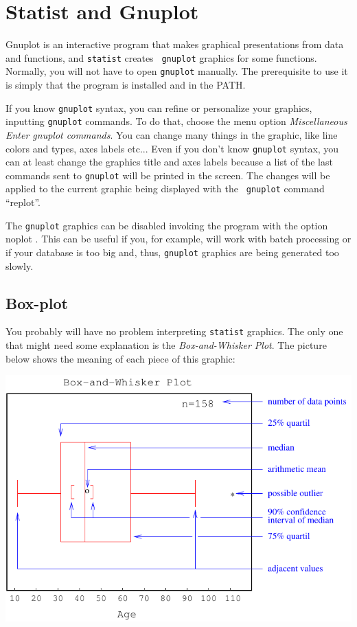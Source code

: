\documentclass[12pt,english]{article}
\newcommand{\st}{{\tt sta\-tist} }
\begin{document}
 
\section{Statist and Gnuplot}

Gnuplot is an interactive program that makes graphical
presentations from data and functions, and \st creates {\tt
gnuplot} graphics for some functions. Normally, you will not
have to open {\tt gnuplot} manually. The prerequisite to use
it is simply that the program is installed and in the PATH.

If you know {\tt gnuplot} syntax, you can refine or
personalize your graphics, inputting {\tt gnu\-plot}
commands. To do that, choose the menu option {\em
Miscellaneous} {\textbar} {\em Enter gnuplot commands}. You can change many
things in the graphic, like line colors and types, axes
labels etc... Even if you don't know {\tt gnuplot} syntax,
you can at least change the graphics title and axes labels
because a list of the last commands sent to {\tt gnuplot}
will be printed in the screen.  The changes will be applied
to the current graphic being displayed with the {\tt
gnuplot} command ``replot''. 

The {\tt gnuplot} graphics can be disabled invoking the
program with the option {\verb --noplot }. This can be
useful if you, for example, will work with batch processing
or if your database is too big and, thus, {\tt gnuplot}
graphics are being generated too slowly.

\subsection{Box-plot}

You probably will have no problem interpreting \st graphics.
The only one that might need some explanation is the {\em
Box-and-Whisker Plot}. The picture below shows the meaning
of each piece of this graphic:

\begin{center}
\includegraphics{boxplot-en}
\end{center}
\end{document}

